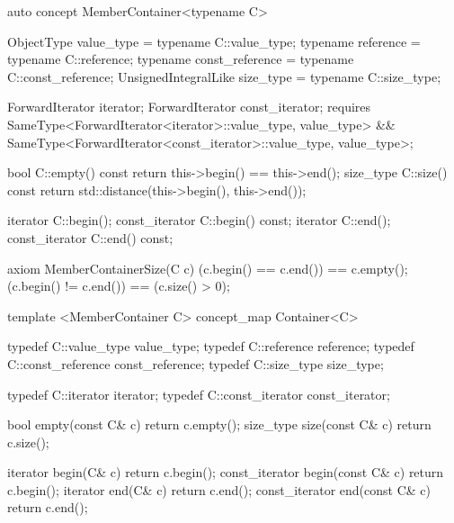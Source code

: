 \documentclass[american,twoside]{book}
\begin{document}
\begin{itemdecl}
auto concept MemberContainer<typename C> {
  ObjectType           value_type      = typename C::value_type;
  typename             reference       = typename C::reference;
  typename             const_reference = typename C::const_reference;
  UnsignedIntegralLike size_type       = typename C::size_type;

  ForwardIterator iterator;
  ForwardIterator const_iterator;
  requires SameType<ForwardIterator<iterator>::value_type, value_type> 
           && SameType<ForwardIterator<const_iterator>::value_type, value_type>;

  bool           C::empty() const { return  this->begin() == this->end(); }
  size_type      C::size() const  { return std::distance(this->begin(), this->end()); }

  iterator       C::begin();
  const_iterator C::begin() const;
  iterator       C::end();
  const_iterator C::end() const;

  axiom MemberContainerSize(C c) {
    (c.begin() == c.end()) == c.empty();
    (c.begin() != c.end()) == (c.size() > 0);
  }
}
\end{itemdecl}

\begin{itemdescr}
\pnum
{}

\pnum
\addedConcepts{\mbox{\requires} for a (possibly
  \mbox{\tcode{const}}-qualified) container \mbox{\tcode{c}},
  \mbox{\tcode{[c.begin(), c.end())}} is a valid range.}
\end{itemdescr}

\begin{itemdecl}
template <MemberContainer C>
concept_map Container<C> {
  typedef C::value_type      value_type;
  typedef C::reference       reference;
  typedef C::const_reference const_reference;
  typedef C::size_type       size_type;

  typedef C::iterator        iterator;
  typedef C::const_iterator  const_iterator;

  bool           empty(const C& c) { return c.empty(); }
  size_type      size(const C& c)  { return c.size(); }

  iterator       begin(C& c)       { return c.begin(); }
  const_iterator begin(const C& c) { return c.begin(); }
  iterator       end(C& c)         { return c.end(); }
  const_iterator end(const C& c)   { return c.end(); }
}
\end{itemdecl}
\end{document}
